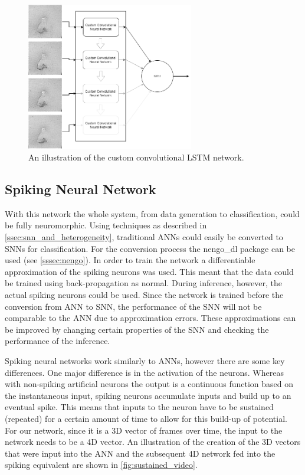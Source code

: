 \begin{figure}[htb]
    \centering
    \includegraphics[width=0.65\textwidth]{analysisanddesign/images/custom_conv_lstm_pipeline.png}
    \caption{An illustration of the custom convolutional LSTM network.}
    \label{fig:custom_conv_lstm_pipeline}
\end{figure}

\subsection{Spiking Neural Network} \label{ssec:snn_design}

With this network the whole system, from data generation to classification, could be fully neuromorphic. Using techniques as described in \cref{ssec:snn_and_heterogeneity}, traditional ANNs could easily be converted to SNNs\cite{Ann2Snn} for classification. For the conversion process the nengo\_dl package can be used (see \cref{sssec:nengo}). In order to train the network a differentiable approximation of the spiking neurons was used. This meant that the data could be trained using back-propagation as normal. During inference, however, the actual spiking neurons could be used\cite{TrainingSnn}. Since the network is trained before the conversion from ANN to SNN, the performance of the SNN will not be comparable to the ANN due to approximation errors. These approximations can be improved by changing certain properties of the SNN and checking the performance of the inference.

Spiking neural networks work similarly to ANNs, however there are some key differences. One major difference is in the activation of the neurons. Whereas with non-spiking artificial neurons the output is a continuous function based on the instantaneous input, spiking neurons accumulate inputs and build up to an eventual spike. This means that inputs to the neuron have to be sustained (repeated) for a certain amount of time to allow for this build-up of potential. For our network, since it is a 3D vector of frames over time, the input to the network needs to be a 4D vector. An illustration of the creation of the 3D vectors that were input into the ANN and the subsequent 4D network fed into the spiking equivalent are shown in \cref{fig:sustained_video}.

